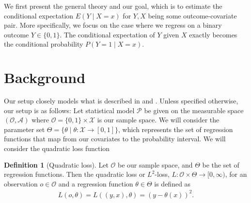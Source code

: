 \documentclass[11pt, a4paper]{article}
\theoremstyle{definition}
\newtheorem{definition}[theorem]{Definition}
\theoremstyle{remark}
\begin{document}
We first present the general theory and our goal, which is to estimate the conditional expectation $ E(Y \mid X = x) $ for $ Y, X $ being some outcome-covariate pair. More specifically, we focus on the case where we regress on a binary outcome $ Y \in \{0,1\} $. The conditional expectation of $ Y $ given $ X $ exactly becomes the conditional probability $ P(Y = 1 \mid X = x) $.


\section{Background}

Our setup closely models what is described in \cite{vaart06} and \cite{laan03}. Unless specified otherwise, our setup is as follows:
Let statistical model $ \mathcal{P} $ be given on the measurable space $ (\mathcal{O}, \mathcal{A}) $ where $ \mathcal{O} = \{0,1\} \times \mathcal{X} $ is our sample space. 
We will consider the parameter set $ \Theta = \{\theta \mid \theta : \mathcal{X} \to [0,1]\} $, which represents the set of regression functions that map from our covariates to the probability interval. We will consider the quadratic loss function
\begin{definition}[Quadratic loss]
    Let $ \mathcal{O}  $ be our sample space, and $ \Theta $ be the set of regression functions. Then the quadratic loss or $ L^2 $-loss, $ L : \mathcal{O} \times \Theta \to [0, \infty) $, for an observation $ o \in \mathcal{O} $ and a regression function $ \theta \in \Theta $ is defined as 
\begin{align*}
    L(o, \theta) = L((y,x), \theta) = (y - \theta(x))^2.
\end{align*}
\end{definition}
\end{document}
